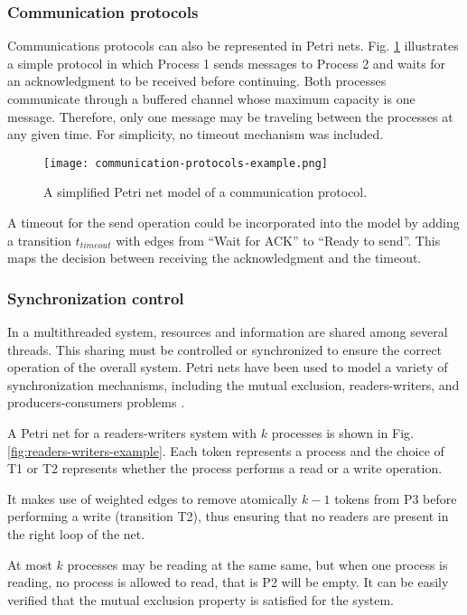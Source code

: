 \documentclass[../Thesis.tex]{subfiles}
\begin{document}
\subsubsection{Communication protocols}

Communications protocols can also be represented in Petri nets.
Fig. \ref{fig:communication-protocols-example} illustrates a simple protocol
in which Process 1 sends messages to Process 2 and
waits for an acknowledgment to be received before continuing.
Both processes communicate through a buffered channel whose maximum capacity is one message.
Therefore, only one message may be traveling between the processes at any given time.
For simplicity, no timeout mechanism was included.

\begin{figure}[H]
    \centering
    \texttt{[image: communication-protocols-example.png]}
    \caption{A simplified Petri net model of a communication protocol.}
    \label{fig:communication-protocols-example}
\end{figure}

A timeout for the send operation could be incorporated into the model
by adding a transition $t_{timeout}$ with edges from ``Wait for ACK'' to ``Ready to send''.
This maps the decision between receiving the acknowledgment and the timeout.

\subsubsection{Synchronization control}

In a multithreaded system, resources and information are shared among several threads.
This sharing must be controlled or synchronized
to ensure the correct operation of the overall system.
Petri nets have been used to model a variety of synchronization mechanisms,
including the mutual exclusion, readers-writers, and producers-consumers problems \cite{murata1989}.

A Petri net for a readers-writers system with $k$ processes
is shown in Fig. \ref{fig:readers-writers-example}.
Each token represents a process and the choice of T1 or T2
represents whether the process performs a read or a write operation.

It makes use of weighted edges to remove atomically
$k - 1$ tokens from P3 before performing a write (transition T2),
thus ensuring that no readers are present in the right loop of the net.

At most $k$ processes may be reading at the same same,
but when one process is reading, no process is allowed to read, that is P2 will be empty.
It can be easily verified that the mutual exclusion property is satisfied for the system.
\end{document}
